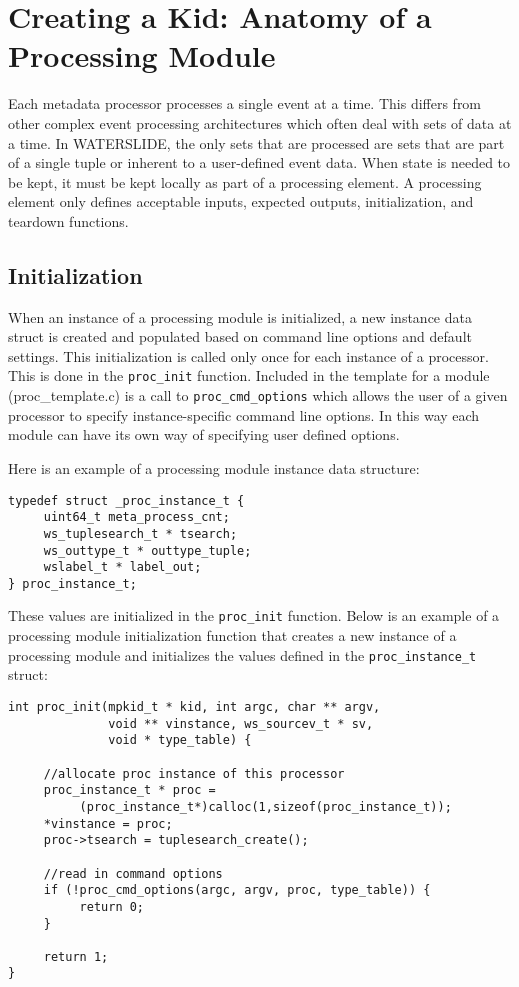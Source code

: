 \documentclass[11pt]{article}
\begin{document}
\section{Creating a Kid: Anatomy of a Processing Module}
Each metadata processor processes a single event at a time.  This differs from 
other complex event processing architectures which often deal with sets of data
at a  time.  In WATERSLIDE, the only sets that are processed are sets that are 
part of a single tuple or  inherent to a user-defined event data.  When state 
is needed to be kept, it must  be kept locally as part of a processing element.
A processing element only defines acceptable inputs, expected outputs, 
initialization, and teardown functions.

\subsection{Initialization}
When an instance of a processing module is initialized, a new instance data 
struct is created and populated based on command line options and default 
settings.  This initialization is called only once for each instance of a 
processor. This is done in the \texttt{proc\_init} function.  Included in the 
template for a module (proc\_template.c) is a call to 
\texttt{proc\_cmd\_options} which allows the user of a given processor to 
specify instance-specific command line options. In this way each module can 
have its own way of specifying user defined options.

Here is an example of a processing module instance data structure:

\begin{lstlisting}
typedef struct _proc_instance_t {
     uint64_t meta_process_cnt;
     ws_tuplesearch_t * tsearch;
     ws_outtype_t * outtype_tuple;
     wslabel_t * label_out;
} proc_instance_t;
\end{lstlisting}

These values are initialized in the \texttt{proc\_init} function.  Below is 
an example of a processing module initialization function that creates 
a new instance of a processing module and initializes the values defined in the
\texttt{proc\_instance\_t} struct:

\begin{lstlisting}
int proc_init(mpkid_t * kid, int argc, char ** argv,
              void ** vinstance, ws_sourcev_t * sv,
              void * type_table) {

     //allocate proc instance of this processor
     proc_instance_t * proc =
          (proc_instance_t*)calloc(1,sizeof(proc_instance_t));
     *vinstance = proc;
     proc->tsearch = tuplesearch_create();

     //read in command options
     if (!proc_cmd_options(argc, argv, proc, type_table)) {
          return 0;
     }

     return 1;
}
\end{lstlisting}
\end{document}
